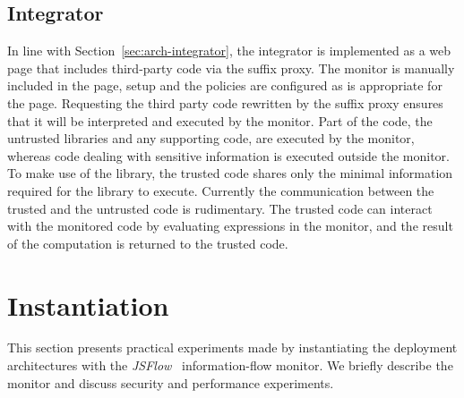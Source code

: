 \documentclass{llncs}
\begin{document}
\subsection{Integrator}


In line with Section~\ref{sec:arch-integrator}, the integrator is implemented as 
a web page that includes third-party code via the suffix proxy. The monitor is 
manually included in the page, setup and the policies are configured as is 
appropriate for the page. Requesting the third party code rewritten by the suffix 
proxy ensures that it will be interpreted and executed by the 
monitor.
%
Part of the code, the untrusted libraries and any supporting code,
are executed by the monitor, whereas code dealing with sensitive 
information is executed outside the monitor. To make use of the library, 
the trusted code shares only the minimal information required for the 
library to execute. Currently the communication between the trusted and the 
untrusted code is rudimentary. The trusted code can interact with the monitored 
code by evaluating expressions in the monitor, and the result of the computation
is returned to the trusted code. 





\section{Instantiation}
\label{sec:case}

This section presents practical experiments made by instantiating the deployment
architectures with the \emph{JSFlow}~\cite{Hedin:Sabelfeld:CSF12,JSFlow} information-flow monitor. 
We briefly describe the monitor and discuss security and performance experiments.
\end{document}
